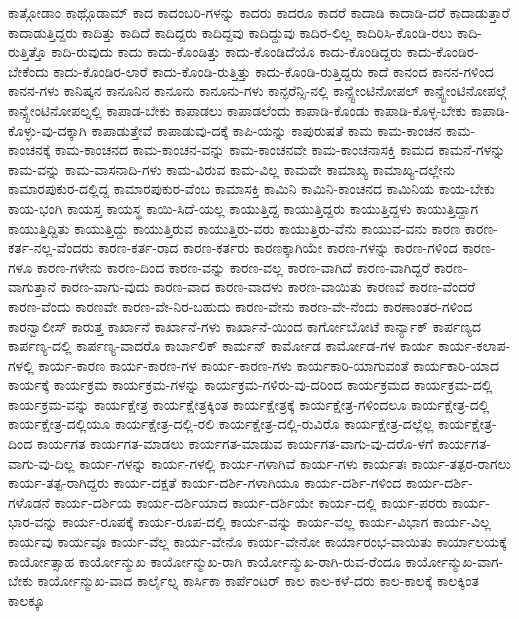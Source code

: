 {ಕಾತ್ಗೋಡಾಂ
ಕಾಥ್ಗೊಡಾಮ್
ಕಾದ
ಕಾದಂಬರಿ-ಗಳನ್ನು
ಕಾದರು
ಕಾದರೂ
ಕಾದರೆ
ಕಾದಾಡಿ
ಕಾದಾಡಿ-ದರೆ
ಕಾದಾಡುತ್ತಾರೆ
ಕಾದಾಡುತ್ತಿದ್ದರು
ಕಾದಿತ್ತು
ಕಾದಿದೆ
ಕಾದಿದ್ದರು
ಕಾದಿದ್ದವು
ಕಾದಿದ್ದುವು
ಕಾದಿರ-ಲಿಲ್ಲ
ಕಾದಿರಿಸಿ-ಕೊಂಡಿ-ರಲು
ಕಾದಿ-ರುತ್ತಿತ್ತೊ
ಕಾದಿ-ರುವುದು
ಕಾದು
ಕಾದು-ಕೊಂಡಿತ್ತು
ಕಾದು-ಕೊಂಡಿದೆಯೊ
ಕಾದು-ಕೊಂಡಿದ್ದರು
ಕಾದು-ಕೊಂಡಿರ-ಬೇಕೆಂದು
ಕಾದು-ಕೊಂಡಿರ-ಲಾರೆ
ಕಾದು-ಕೊಂಡಿ-ರುತ್ತಿತ್ತು
ಕಾದು-ಕೊಂಡಿ-ರುತ್ತಿದ್ದರು
ಕಾದೆ
ಕಾನಂದ
ಕಾನನ-ಗಳಿಂದ
ಕಾನನ-ಗಳು
ಕಾನಿಷ್ಕನ
ಕಾನೂನಿನ
ಕಾನೂನು
ಕಾನೂನು-ಗಳು
ಕಾನ್ಫರೆನ್ಸಿ-ನಲ್ಲಿ
ಕಾನ್ಸ್ಟೇಂಟಿನೋಪಲ್
ಕಾನ್ಸ್ಟೇಂಟಿನೋಪಲ್ಗೆ
ಕಾನ್ಸ್ಟೇಂಟಿನೋಪಲ್ನಲ್ಲಿ
ಕಾಪಾಡ-ಬೇಕು
ಕಾಪಾಡಲು
ಕಾಪಾಡಲೆಂದು
ಕಾಪಾಡಿ-ಕೊಂಡು
ಕಾಪಾಡಿ-ಕೊಳ್ಳ-ಬೇಕು
ಕಾಪಾಡಿ-ಕೊಳ್ಳು-ವು-ದಕ್ಕಾಗಿ
ಕಾಪಾಡುತ್ತೇವೆ
ಕಾಪಾಡುವು-ದಕ್ಕೆ
ಕಾಪಿ-ಯನ್ನು
ಕಾಪುರುಷತೆ
ಕಾಮ
ಕಾಮ-ಕಾಂಚನ
ಕಾಮ-ಕಾಂಚನಕ್ಕೆ
ಕಾಮ-ಕಾಂಚನದ
ಕಾಮ-ಕಾಂಚನ-ವನ್ನು
ಕಾಮ-ಕಾಂಚನವೇ
ಕಾಮ-ಕಾಂಚನಾಸಕ್ತಿ
ಕಾಮದ
ಕಾಮನೆ-ಗಳನ್ನು
ಕಾಮ-ವನ್ನು
ಕಾಮ-ವಾಸನಾದಿ-ಗಳು
ಕಾಮ-ವಿರುವ
ಕಾಮ-ವಿಲ್ಲ
ಕಾಮವೇ
ಕಾಮಾಖ್ಯ
ಕಾಮಾಖ್ಯ-ದಲ್ಲೇನು
ಕಾಮಾರಪುಕುರ-ದಲ್ಲಿದ್ದ
ಕಾಮಾರಪುಕುರ-ವೆಂಬ
ಕಾಮಾಸಕ್ತಿ
ಕಾಮಿನಿ
ಕಾಮಿನಿ-ಕಾಂಚನದ
ಕಾಮಿನಿಯ
ಕಾಯ-ಬೇಕು
ಕಾಯ-ಭಂಗಿ
ಕಾಯಸ್ತ
ಕಾಯಸ್ಥ
ಕಾಯಿ-ಸಿದೆ-ಯಲ್ಲ
ಕಾಯುತ್ತಿದ್ದ
ಕಾಯುತ್ತಿದ್ದರು
ಕಾಯುತ್ತಿದ್ದಳು
ಕಾಯುತ್ತಿದ್ದಾಗ
ಕಾಯುತ್ತಿದ್ದಿತು
ಕಾಯುತ್ತಿದ್ದು
ಕಾಯುತ್ತಿರುವ
ಕಾಯುತ್ತಿರು-ವರು
ಕಾಯುತ್ತಿರು-ವೆನು
ಕಾಯುವ-ವನು
ಕಾರಣ
ಕಾರಣ-ಕರ್ತ-ನಲ್ಲ-ವೆಂದರು
ಕಾರಣ-ಕರ್ತ-ರಾದ
ಕಾರಣ-ಕರ್ತರು
ಕಾರಣಕ್ಕಾಗಿಯೇ
ಕಾರಣ-ಗಳನ್ನು
ಕಾರಣ-ಗಳಿಂದ
ಕಾರಣ-ಗಳೂ
ಕಾರಣ-ಗಳೇನು
ಕಾರಣ-ದಿಂದ
ಕಾರಣ-ವನ್ನು
ಕಾರಣ-ವಲ್ಲ
ಕಾರಣ-ವಾಗಿದೆ
ಕಾರಣ-ವಾಗಿದ್ದರೆ
ಕಾರಣ-ವಾಗುತ್ತಾನೆ
ಕಾರಣ-ವಾಗು-ವುದು
ಕಾರಣ-ವಾದ
ಕಾರಣ-ವಾದಳು
ಕಾರಣ-ವಾಯಿತು
ಕಾರಣವೆ
ಕಾರಣ-ವೆಂದರೆ
ಕಾರಣ-ವೆಂದು
ಕಾರಣವೇ
ಕಾರಣ-ವೇ-ನಿರ-ಬಹುದು
ಕಾರಣ-ವೇನು
ಕಾರಣ-ವೇ-ನೆಂದು
ಕಾರಣಾಂತರ-ಗಳಿಂದ
ಕಾರನ್ವಾಲೀಸ್
ಕಾರುತ್ತ
ಕಾರ್ಖಾನೆ
ಕಾರ್ಖಾನೆ-ಗಳು
ಕಾರ್ಖಾನೆ-ಯಿಂದ
ಕಾರ್ಗೋಬೋಟೆ
ಕಾರ್ನ್ಯಾಕ್
ಕಾರ್ಪಣ್ಯದ
ಕಾರ್ಪಣ್ಯ-ದಲ್ಲಿ
ಕಾರ್ಪಣ್ಯ-ವಾದರೊ
ಕಾರ್ಬಾಲಿಕ್
ಕಾರ್ಮನ್
ಕಾರ್ಮೋಡ
ಕಾರ್ಮೋಡ-ಗಳ
ಕಾರ್ಯ
ಕಾರ್ಯ-ಕಲಾಪ-ಗಳಲ್ಲಿ
ಕಾರ್ಯ-ಕಾರಣ
ಕಾರ್ಯ-ಕಾರಣ-ಗಳ
ಕಾರ್ಯ-ಕಾರಣ-ಗಳು
ಕಾರ್ಯಕಾರಿ-ಯಾಗುವಂತೆ
ಕಾರ್ಯಕಾರಿ-ಯಾದ
ಕಾರ್ಯಕ್ಕೆ
ಕಾರ್ಯಕ್ರಮ
ಕಾರ್ಯಕ್ರಮ-ಗಳನ್ನು
ಕಾರ್ಯಕ್ರಮ-ಗಳಿರು-ವು-ದರಿಂದ
ಕಾರ್ಯಕ್ರಮದ
ಕಾರ್ಯಕ್ರಮ-ದಲ್ಲಿ
ಕಾರ್ಯಕ್ರಮ-ವನ್ನು
ಕಾರ್ಯಕ್ಷೇತ್ರ
ಕಾರ್ಯಕ್ಷೇತ್ರಕ್ಕಿಂತ
ಕಾರ್ಯಕ್ಷೇತ್ರಕ್ಕೆ
ಕಾರ್ಯಕ್ಷೇತ್ರ-ಗಳಿಂದಲೂ
ಕಾರ್ಯಕ್ಷೇತ್ರ-ದಲ್ಲಿ
ಕಾರ್ಯಕ್ಷೇತ್ರ-ದಲ್ಲಿಯೂ
ಕಾರ್ಯಕ್ಷೇತ್ರ-ದಲ್ಲಿ-ರಲಿ
ಕಾರ್ಯಕ್ಷೇತ್ರ-ದಲ್ಲಿ-ರುವಿರೊ
ಕಾರ್ಯಕ್ಷೇತ್ರ-ದಲ್ಲೆಲ್ಲ
ಕಾರ್ಯಕ್ಷೇತ್ರ-ದಿಂದ
ಕಾರ್ಯಗತ
ಕಾರ್ಯಗತ-ಮಾಡಲು
ಕಾರ್ಯಗತ-ಮಾಡುವ
ಕಾರ್ಯಗತ-ವಾಗು-ವು-ದರೊ-ಳಗೆ
ಕಾರ್ಯಗತ-ವಾಗು-ವು-ದಿಲ್ಲ
ಕಾರ್ಯ-ಗಳನ್ನು
ಕಾರ್ಯ-ಗಳಲ್ಲಿ
ಕಾರ್ಯ-ಗಳಾಗಿವೆ
ಕಾರ್ಯ-ಗಳು
ಕಾರ್ಯತಃ
ಕಾರ್ಯ-ತತ್ಪರ-ರಾಗಲು
ಕಾರ್ಯ-ತತ್ಪ-ರಾಗಿದ್ದರು
ಕಾರ್ಯ-ದಕ್ಷತೆ
ಕಾರ್ಯ-ದರ್ಶಿ-ಗಳಾಗಿಯೂ
ಕಾರ್ಯ-ದರ್ಶಿ-ಗಳಿಂದ
ಕಾರ್ಯ-ದರ್ಶಿ-ಗಳೊಡನೆ
ಕಾರ್ಯ-ದರ್ಶಿಯ
ಕಾರ್ಯ-ದರ್ಶಿಯಾದ
ಕಾರ್ಯ-ದರ್ಶಿಯೇ
ಕಾರ್ಯ-ದಲ್ಲಿ
ಕಾರ್ಯ-ಪರರು
ಕಾರ್ಯ-ಭಾರ-ವನ್ನು
ಕಾರ್ಯ-ರೂಪಕ್ಕೆ
ಕಾರ್ಯ-ರೂಪ-ದಲ್ಲಿ
ಕಾರ್ಯ-ವನ್ನು
ಕಾರ್ಯ-ವಲ್ಲ
ಕಾರ್ಯ-ವಿಭಾಗ
ಕಾರ್ಯ-ವಿಲ್ಲ
ಕಾರ್ಯವು
ಕಾರ್ಯವೂ
ಕಾರ್ಯ-ವೆಲ್ಲ
ಕಾರ್ಯ-ವೇನೊ
ಕಾರ್ಯ-ವೇನೋ
ಕಾರ್ಯಾರಂಭ-ವಾಯಿತು
ಕಾರ್ಯಾಲಯಕ್ಕೆ
ಕಾರ್ಯೋತ್ಸಾಹ
ಕಾರ್ಯೋನ್ಮುಖ
ಕಾರ್ಯೋನ್ಮುಖ-ರಾಗಿ
ಕಾರ್ಯೋನ್ಮುಖ-ರಾಗಿ-ರುವ-ರೆಂದೂ
ಕಾರ್ಯೋನ್ಮುಖ-ವಾಗ-ಬೇಕು
ಕಾರ್ಯೋನ್ಮುಖ-ವಾದ
ಕಾರ್ಲೈಲ್ನ
ಕಾರ್ಸಿಕಾ
ಕಾರ್ಪೆಂಟರ್
ಕಾಲ
ಕಾಲ-ಕಳೆ-ದರು
ಕಾಲ-ಕಾಲಕ್ಕೆ
ಕಾಲಕ್ಕಿಂತ
ಕಾಲಕ್ಕೂ
}
